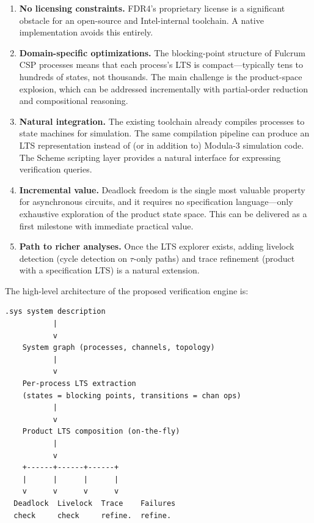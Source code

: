 \documentclass[11pt]{article}
\begin{document}
\begin{enumerate}
\item \textbf{No licensing constraints.}  FDR4's proprietary license
  is a significant obstacle for an open-source and Intel-internal
  toolchain.  A native implementation avoids this entirely.

\item \textbf{Domain-specific optimizations.}  The blocking-point
  structure of Fulcrum CSP processes means that each process's LTS is
  compact---typically tens to hundreds of states, not thousands.
  The main challenge is the product-space explosion, which can be
  addressed incrementally with partial-order reduction and
  compositional reasoning.

\item \textbf{Natural integration.}  The existing toolchain already
  compiles processes to state machines for simulation.  The same
  compilation pipeline can produce an LTS representation instead of
  (or in addition to) Modula-3 simulation code.  The Scheme scripting
  layer provides a natural interface for expressing verification
  queries.

\item \textbf{Incremental value.}  Deadlock freedom is the single
  most valuable property for asynchronous circuits, and it requires
  no specification language---only exhaustive exploration of the
  product state space.  This can be delivered as a first milestone
  with immediate practical value.

\item \textbf{Path to richer analyses.}  Once the LTS explorer
  exists, adding livelock detection (cycle detection on $\tau$-only
  paths) and trace refinement (product with a specification LTS) is
  a natural extension.
\end{enumerate}

The high-level architecture of the proposed verification engine is:

\begin{Verbatim}[samepage=true]
  .sys system description
           |
           v
    System graph (processes, channels, topology)
           |
           v
    Per-process LTS extraction
    (states = blocking points, transitions = chan ops)
           |
           v
    Product LTS composition (on-the-fly)
           |
           v
    +------+------+------+
    |      |      |      |
    v      v      v      v
  Deadlock  Livelock  Trace    Failures
  check     check     refine.  refine.
\end{Verbatim}
\end{document}
